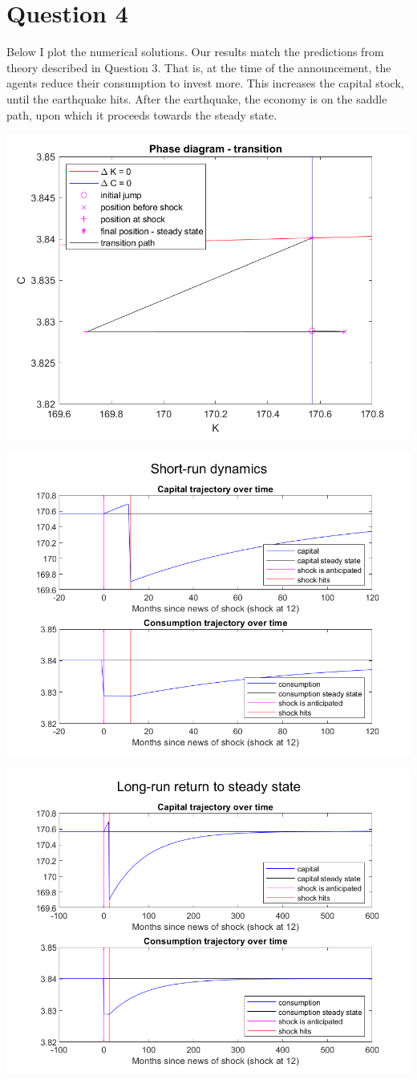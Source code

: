 \documentclass[11pt]{article} %
\begin{document}
\section{Question 4}

Below I plot the numerical solutions. Our results match the predictions from theory described in Question 3. That is, at the time of the announcement, the agents reduce their consumption to invest more. This increases the capital stock, until the earthquake hits. After the earthquake, the economy is on the saddle path, upon which it proceeds towards the steady state.

 \includegraphics{phtr}

\includegraphics{shortrun}

\includegraphics{longrun}
\end{document}
